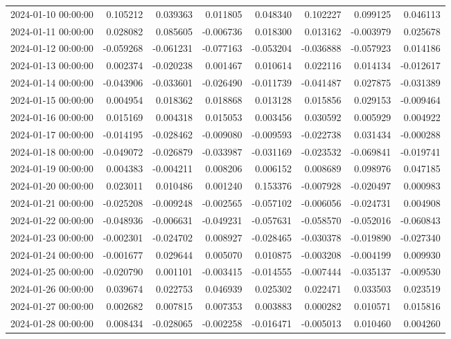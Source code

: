 \begin{tabular}{lrrrrrrr}
2024-01-10 00:00:00 & 0.105212 & 0.039363 & 0.011805 & 0.048340 & 0.102227 & 0.099125 & 0.046113 \\
2024-01-11 00:00:00 & 0.028082 & 0.085605 & -0.006736 & 0.018300 & 0.013162 & -0.003979 & 0.025678 \\
2024-01-12 00:00:00 & -0.059268 & -0.061231 & -0.077163 & -0.053204 & -0.036888 & -0.057923 & 0.014186 \\
2024-01-13 00:00:00 & 0.002374 & -0.020238 & 0.001467 & 0.010614 & 0.022116 & 0.014134 & -0.012617 \\
2024-01-14 00:00:00 & -0.043906 & -0.033601 & -0.026490 & -0.011739 & -0.041487 & 0.027875 & -0.031389 \\
2024-01-15 00:00:00 & 0.004954 & 0.018362 & 0.018868 & 0.013128 & 0.015856 & 0.029153 & -0.009464 \\
2024-01-16 00:00:00 & 0.015169 & 0.004318 & 0.015053 & 0.003456 & 0.030592 & 0.005929 & 0.004922 \\
2024-01-17 00:00:00 & -0.014195 & -0.028462 & -0.009080 & -0.009593 & -0.022738 & 0.031434 & -0.000288 \\
2024-01-18 00:00:00 & -0.049072 & -0.026879 & -0.033987 & -0.031169 & -0.023532 & -0.069841 & -0.019741 \\
2024-01-19 00:00:00 & 0.004383 & -0.004211 & 0.008206 & 0.006152 & 0.008689 & 0.098976 & 0.047185 \\
2024-01-20 00:00:00 & 0.023011 & 0.010486 & 0.001240 & 0.153376 & -0.007928 & -0.020497 & 0.000983 \\
2024-01-21 00:00:00 & -0.025208 & -0.009248 & -0.002565 & -0.057102 & -0.006056 & -0.024731 & 0.004908 \\
2024-01-22 00:00:00 & -0.048936 & -0.006631 & -0.049231 & -0.057631 & -0.058570 & -0.052016 & -0.060843 \\
2024-01-23 00:00:00 & -0.002301 & -0.024702 & 0.008927 & -0.028465 & -0.030378 & -0.019890 & -0.027340 \\
2024-01-24 00:00:00 & -0.001677 & 0.029644 & 0.005070 & 0.010875 & -0.003208 & -0.004199 & 0.009930 \\
2024-01-25 00:00:00 & -0.020790 & 0.001101 & -0.003415 & -0.014555 & -0.007444 & -0.035137 & -0.009530 \\
2024-01-26 00:00:00 & 0.039674 & 0.022753 & 0.046939 & 0.025302 & 0.022471 & 0.033503 & 0.023519 \\
2024-01-27 00:00:00 & 0.002682 & 0.007815 & 0.007353 & 0.003883 & 0.000282 & 0.010571 & 0.015816 \\
2024-01-28 00:00:00 & 0.008434 & -0.028065 & -0.002258 & -0.016471 & -0.005013 & 0.010460 & 0.004260 \\

\end{tabular}
